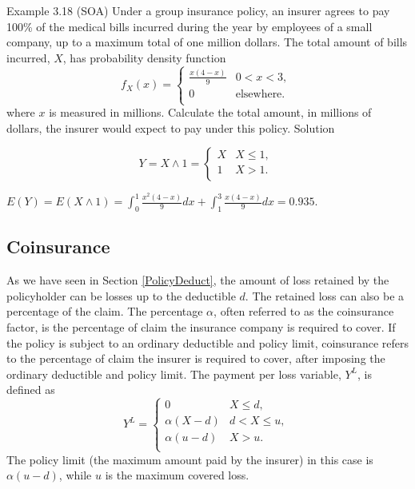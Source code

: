 \documentclass[]{book}
\begin{document}
Example 3.18 (SOA) Under a group insurance policy, an insurer agrees to
pay 100\% of the medical bills incurred during the year by employees of
a small company, up to a maximum total of one million dollars. The total
amount of bills incurred, \(X\), has probability density function
\[f_{X}\left( x \right) = \left\{ \begin{matrix}
\frac{x\left( 4 - x \right)}{9} & 0 < x < 3, \\
0 & \text{elsewhere.} \\
\end{matrix} \right.\ \] where \(x\) is measured in millions. Calculate
the total amount, in millions of dollars, the insurer would expect to
pay under this policy. Solution

\[Y = X \land 1 = \left\{ \begin{matrix}
X & X \leq 1, \\
1 & X > 1. \\
\end{matrix} \right.\ \]

\(E\left( Y \right) = E\left( X \land 1 \right) = \int_{0}^{1}\frac{x^{2}(4 - x)}{9}dx + \int_{1}^{3}\frac{x\left( 4 - x \right)}{9}dx = 0.935\).

\subsection{Coinsurance}\label{coinsurance}

As we have seen in Section \ref{PolicyDeduct}, the amount of loss
retained by the policyholder can be losses up to the deductible \(d\).
The retained loss can also be a percentage of the claim. The percentage
\(\alpha\), often referred to as the coinsurance factor, is the
percentage of claim the insurance company is required to cover. If the
policy is subject to an ordinary deductible and policy limit,
coinsurance refers to the percentage of claim the insurer is required to
cover, after imposing the ordinary deductible and policy limit. The
payment per loss variable, \(Y^{L}\), is defined as
\[Y^{L} = \left\{ \begin{matrix}
0 & X \leq d, \\
\alpha\left( X - d \right) & d <  X \leq u, \\
\alpha\left( u - d \right) & X > u. \\
\end{matrix} \right.\ \] The policy limit (the maximum amount paid by
the insurer) in this case is \(\alpha\left( u - d \right)\), while \(u\)
is the maximum covered loss.
\end{document}
